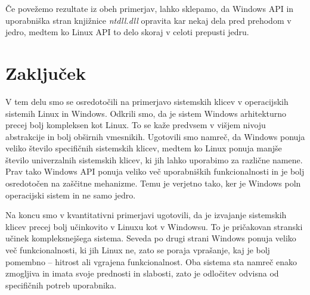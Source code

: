 \documentclass[a4paper,12pt,openright]{book}
\begin{document}
Če povežemo rezultate iz obeh primerjav, lahko sklepamo, da Windows API in uporabniška stran knjižnice \textit{ntdll.dll} opravita kar nekaj dela pred prehodom v jedro, medtem ko Linux API to delo skoraj v celoti prepusti jedru.

\chapter{Zaključek}

V tem delu smo se osredotočili na primerjavo sistemskih klicev v operacijskih sistemih Linux in Windows.
Odkrili smo, da je sistem Windows arhitekturno precej bolj kompleksen kot Linux.
To se kaže predvsem v višjem nivoju abstrakcije in bolj obširnih vmesnikih.
Ugotovili smo namreč, da Windows ponuja veliko število specifičnih sistemskih klicev, medtem ko Linux ponuja manjše število univerzalnih sistemskih klicev, ki jih lahko uporabimo za različne namene.
Prav tako Windows API ponuja veliko več uporabniških funkcionalnosti in je bolj osredotočen na zaščitne mehanizme.
Temu je verjetno tako, ker je Windows poln operacijski sistem in ne samo jedro.

Na koncu smo v kvantitativni primerjavi ugotovili, da je izvajanje sistemskih klicev precej bolj učinkovito v Linuxu kot v Windowsu.
To je pričakovan stranski učinek kompleksnejšega sistema.
Seveda po drugi strani Windows ponuja veliko več funkcionalnosti, ki jih Linux ne, zato se poraja vprašanje, kaj je bolj pomembno -- hitrost ali vgrajena funkcionalnost.
Oba sistema sta namreč enako zmogljiva in imata svoje prednosti in slabosti, zato je odločitev odvisna od specifičnih potreb uporabnika.


\printbibliography[heading=bibintoc,title={Literatura}]
\end{document}
